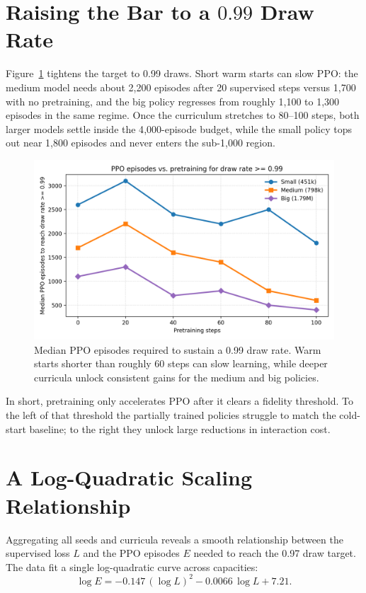 \documentclass[11pt]{article}
\begin{document}
\section{Raising the Bar to a \texorpdfstring{$0.99$}{0.99} Draw Rate}
Figure~\ref{fig:episodes99} tightens the target to 0.99 draws. Short warm starts can slow PPO: the medium model needs about 2{,}200 episodes after 20 supervised steps versus 1{,}700 with no pretraining, and the big policy regresses from roughly 1{,}100 to 1{,}300 episodes in the same regime. Once the curriculum stretches to 80--100 steps, both larger models settle inside the 4{,}000-episode budget, while the small policy tops out near 1{,}800 episodes and never enters the sub-1{,}000 region.

\begin{figure}[H]
    \centering
    \includegraphics[width=0.75\linewidth]{warm-start-episodes-0_99.png}
    \caption{Median PPO episodes required to sustain a 0.99 draw rate. Warm starts shorter than roughly 60 steps can slow learning, while deeper curricula unlock consistent gains for the medium and big policies.}
    \label{fig:episodes99}
\end{figure}

In short, pretraining only accelerates PPO after it clears a fidelity threshold. To the left of that threshold the partially trained policies struggle to match the cold-start baseline; to the right they unlock large reductions in interaction cost.

\section{A Log-Quadratic Scaling Relationship}
Aggregating all seeds and curricula reveals a smooth relationship between the supervised loss $L$ and the PPO episodes $E$ needed to reach the 0.97 draw target. The data fit a single log-quadratic curve across capacities:
\begin{equation}
\log E = -0.147\,(\log L)^2 - 0.0066\,\log L + 7.21.
\label{eq:logquadratic}
\end{equation}
\end{document}
